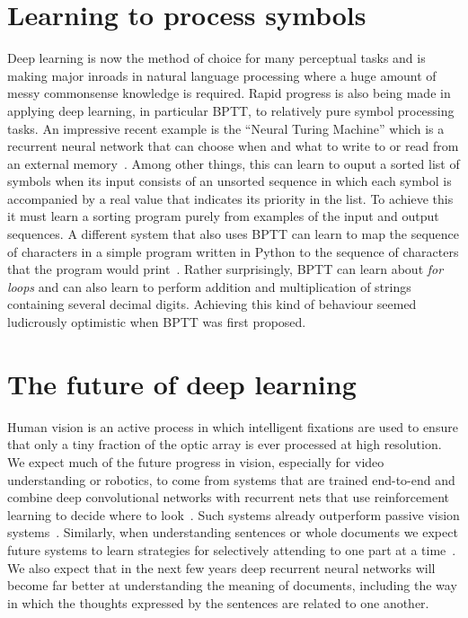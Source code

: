 \documentclass[]{article}
\begin{document}
\section{Learning to process symbols}

Deep learning is now the method of choice for many perceptual tasks and is
making major inroads in natural language processing where a huge amount of
messy commonsense knowledge is required. Rapid progress is also being made
in applying deep learning, in particular BPTT, to relatively pure symbol processing tasks.
An impressive recent example is the ``Neural Turing Machine'' which is a
recurrent neural network that can choose when and what to write to or read
from an external memory~\citep{Graves-et-al-arxiv2014}. 
Among other things, this can learn to
ouput a sorted list of symbols when its input consists of an unsorted
sequence in which each symbol is accompanied by a real value that indicates
its priority in the list.  To achieve this it must learn a sorting program
purely from examples of the input and output sequences.  A different system
that also uses BPTT can learn to map the sequence of characters in a simple
program written in Python to the sequence of characters that the program
would print~\citep{Zaremba+Sutskever-arxiv2014}. 
Rather surprisingly, BPTT can learn about {\it for
  loops} and can also learn to perform addition and multiplication of
strings containing several decimal digits. Achieving this kind of behaviour
seemed ludicrously optimistic when BPTT was first proposed.
  
\section{The future of deep learning}

Human vision is an active process in which intelligent fixations are used
to ensure that only a tiny fraction of the optic array is ever processed at
high resolution. We expect much of the future progress in vision,
especially for video understanding or robotics, to come from systems that
are trained end-to-end and combine deep convolutional networks with
recurrent nets that use reinforcement learning to decide where to
look~\citep{rl+attention}.  Such systems already outperform passive vision
systems~\citep{ba+mnih}.  Similarly, when understanding sentences or whole
documents we expect future systems to learn strategies for selectively
attending to one part at a time~\citep{Bahdanau-et-al-arxiv2014}. We also expect
that in the next few years deep recurrent neural networks will become far
better at understanding the meaning of documents, including the way in
which the thoughts expressed by the sentences are related to one another.
\end{document}
